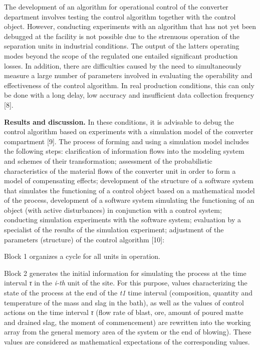 The development of an algorithm for operational control of the converter
department involves testing the control algorithm together with the
control object. However, conducting experiments with an algorithm that
has not yet been debugged at the facility is not possible due to the
strenuous operation of the separation units in industrial conditions.
The output of the latter\textquotesingle s operating modes beyond the
scope of the regulated one entailed significant production losses. In
addition, there are difficulties caused by the need to simultaneously
measure a large number of parameters involved in evaluating the
operability and effectiveness of the control algorithm. In real
production conditions, this can only be done with a long delay, low
accuracy and insufficient data collection frequency {[}8{]}.

\textbf{Results and discussion.} In these conditions, it is advisable to
debug the control algorithm based on experiments with a simulation model
of the converter compartment {[}9{]}. The process of forming and using a
simulation model includes the following steps: clarification of
information flows into the modeling system and schemes of their
transformation; assessment of the probabilistic characteristics of the
material flows of the converter unit in order to form a model of
compensating effects; development of the structure of a software system
that simulates the functioning of a control object based on a
mathematical model of the process, development of a software system
simulating the functioning of an object (with active disturbances) in
conjunction with a control system; conducting simulation experiments
with the software system; evaluation by a specialist of the results of
the simulation experiment; adjustment of the parameters (structure) of
the control algorithm {[}10{]}:

Block 1 organizes a cycle for all units in operation.

Block 2 generates the initial information for simulating the process at
the time interval \emph{τ} in the \emph{i-th} unit of the site. For this
purpose, values characterizing the state of the process at the end of
the \emph{t1} time interval (composition, quantity and temperature of
the mass and slag in the bath), as well as the values of control actions
on the time interval \emph{τ} (flow rate of blast, ore, amount of poured
matte and drained slag, the moment of commencement) are rewritten into
the working array from the general memory area of the system or the end
of blowing). These values are considered as mathematical expectations of
the corresponding values.

